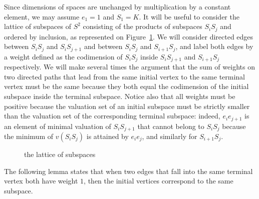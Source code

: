 \documentclass[ALCO,Unicode,ThmDefs]{cedram}
\begin{document}
Since dimensions of spaces are unchanged by multiplication by a constant element, we may assume $e_1=1$ and $S_1=K$. It will be useful to consider the lattice of subspaces of $S^2$ consisting of the products of subspaces $S_iS_j$ and ordered by inclusion, as represented on Figure~\ref{fig:subspaces}. We will consider directed edges between $S_iS_j$ and $S_iS_{j+1}$ and between $S_iS_j$ and $S_{i+1}S_{j}$, and label both edges by a weight defined as the codimension of $S_iS_j$ inside $S_iS_{j+1}$ and $S_{i+1}S_{j}$ respectively. We will make several times the argument that the sum of weights on two directed paths that lead from the same initial vertex to the same terminal vertex must be the same because they both equal the codimension of the initial subspace inside the terminal subspace. Notice also that all weights must be positive because the valuation set of an initial subspace must be strictly smaller than the valuation set of the corresponding terminal subspace: indeed, $e_ie_{j+1}$ is an element of minimal valuation of $S_iS_{j+1}$ that cannot belong to $S_iS_j$ because the minimum of $v(S_iS_j)$ is attained by $e_ie_j$, and similarly for $S_{i+1}S_j$.

\begin{figure}[!h]
\centering
{}
\caption{the lattice of subspaces}\label{fig:subspaces}
\end{figure}

The following lemma states that when two edges that fall into the same terminal vertex both have weight $1$, then the initial vertices correspond to the same subspace.
\end{document}
